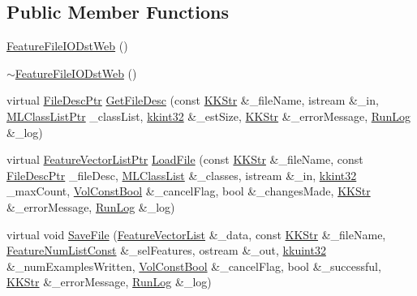 \subsection*{Public Member Functions}
\begin{DoxyCompactItemize}
\item 
\hyperlink{class_k_k_m_l_l_1_1_feature_file_i_o_dst_web_a55cf200c96d41a203977578174e6e48b}{Feature\+File\+I\+O\+Dst\+Web} ()
\item 
\hyperlink{class_k_k_m_l_l_1_1_feature_file_i_o_dst_web_a2b82d9c18471917898c922c2d6bcfb6f}{$\sim$\+Feature\+File\+I\+O\+Dst\+Web} ()
\item 
virtual \hyperlink{namespace_k_k_m_l_l_aa0d0b6ab4ec18868a399b8455b05d914}{File\+Desc\+Ptr} \hyperlink{class_k_k_m_l_l_1_1_feature_file_i_o_dst_web_a61d30349e8493710a401e7aa9ffd3981}{Get\+File\+Desc} (const \hyperlink{class_k_k_b_1_1_k_k_str}{K\+K\+Str} \&\+\_\+file\+Name, istream \&\+\_\+in, \hyperlink{namespace_k_k_m_l_l_af091cde3f4a4315658b41a5e7583fc26}{M\+L\+Class\+List\+Ptr} \+\_\+class\+List, \hyperlink{namespace_k_k_b_a8fa4952cc84fda1de4bec1fbdd8d5b1b}{kkint32} \&\+\_\+est\+Size, \hyperlink{class_k_k_b_1_1_k_k_str}{K\+K\+Str} \&\+\_\+error\+Message, \hyperlink{class_k_k_b_1_1_run_log}{Run\+Log} \&\+\_\+log)
\item 
virtual \hyperlink{namespace_k_k_m_l_l_acf2ba92a3cf03e2b19674b24ff488ef6}{Feature\+Vector\+List\+Ptr} \hyperlink{class_k_k_m_l_l_1_1_feature_file_i_o_dst_web_a779a5ed11f617efe695bac2327711ee7}{Load\+File} (const \hyperlink{class_k_k_b_1_1_k_k_str}{K\+K\+Str} \&\+\_\+file\+Name, const \hyperlink{namespace_k_k_m_l_l_aa0d0b6ab4ec18868a399b8455b05d914}{File\+Desc\+Ptr} \+\_\+file\+Desc, \hyperlink{class_k_k_m_l_l_1_1_m_l_class_list}{M\+L\+Class\+List} \&\+\_\+classes, istream \&\+\_\+in, \hyperlink{namespace_k_k_b_a8fa4952cc84fda1de4bec1fbdd8d5b1b}{kkint32} \+\_\+max\+Count, \hyperlink{namespace_k_k_b_a7d390f568e2831fb76b86b56c87bf92f}{Vol\+Const\+Bool} \&\+\_\+cancel\+Flag, bool \&\+\_\+changes\+Made, \hyperlink{class_k_k_b_1_1_k_k_str}{K\+K\+Str} \&\+\_\+error\+Message, \hyperlink{class_k_k_b_1_1_run_log}{Run\+Log} \&\+\_\+log)
\item 
virtual void \hyperlink{class_k_k_m_l_l_1_1_feature_file_i_o_dst_web_a5a311279096fc6ced248d72b2983fb7c}{Save\+File} (\hyperlink{class_k_k_m_l_l_1_1_feature_vector_list}{Feature\+Vector\+List} \&\+\_\+data, const \hyperlink{class_k_k_b_1_1_k_k_str}{K\+K\+Str} \&\+\_\+file\+Name, \hyperlink{namespace_k_k_m_l_l_ad276a9ed309552a63300bce930bdfebd}{Feature\+Num\+List\+Const} \&\+\_\+sel\+Features, ostream \&\+\_\+out, \hyperlink{namespace_k_k_b_af8d832f05c54994a1cce25bd5743e19a}{kkuint32} \&\+\_\+num\+Examples\+Written, \hyperlink{namespace_k_k_b_a7d390f568e2831fb76b86b56c87bf92f}{Vol\+Const\+Bool} \&\+\_\+cancel\+Flag, bool \&\+\_\+successful, \hyperlink{class_k_k_b_1_1_k_k_str}{K\+K\+Str} \&\+\_\+error\+Message, \hyperlink{class_k_k_b_1_1_run_log}{Run\+Log} \&\+\_\+log)
\end{DoxyCompactItemize}
